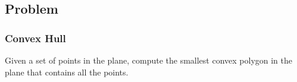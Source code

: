 \subsection[Problem]{Problem}

\begin{frame}
\frametitle{Convex Hull}
Given a set of points in the plane, compute the smallest convex polygon in the plane that contains all the points.
\end{frame}